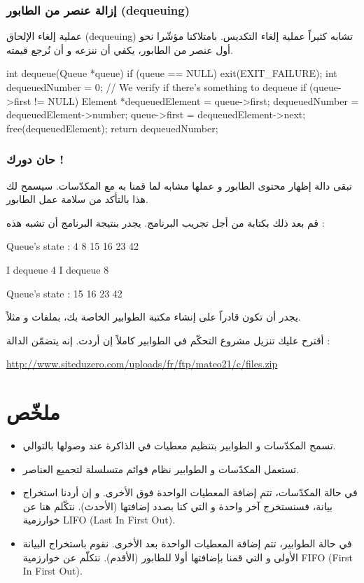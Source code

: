\subsubsection{إزالة عنصر من الطابور (\textenglish{dequeuing})}

عملية إلغاء الإلحاق 
(\textenglish{dequeuing})
تشابه كثيراً عملية إلغاء التكديس. بامتلاكنا مؤشّرا نحو أول عنصر من الطابور، يكفي أن ننزعه و أن نُرجع قيمته.

\begin{Csource}
int dequeue(Queue *queue)
{
	if (queue == NULL)
	{
		exit(EXIT_FAILURE);
	}
	int dequeuedNumber = 0;
	// We verify if there's something to dequeue
	if (queue->first != NULL)
	{
		Element *dequeuedElement = queue->first;
		dequeuedNumber = dequeuedElement->number;
		queue->first = dequeuedElement->next;
		free(dequeuedElement);
	}
	return dequeuedNumber;
}
\end{Csource}

\subsubsection{حان دورك !}

تبقى دالة إظهار محتوى الطابور
و عملها مشابه لما قمنا به مع المكدّسات. سيسمح لك هذا بالتأكد من سلامة عمل الطابور.

قم بعد ذلك بكتابة
من أجل تجريب البرنامج. يجدر بنتيجة البرنامج أن تشبه هذه :

\begin{Console}
Queue's state :
4 8 15 16 23 42

I dequeue 4
I dequeue 8

Queue's state :
15 16 23 42
\end{Console}

يجدر أن تكون قادراً على إنشاء مكتبة الطوابير الخاصة بك، بملفات
و
مثلاً.

أقترح عليك تنزيل مشروع التحكّم في الطوابير كاملاً إن أردت. إنه يتضمّن الدالة
 :

\url{http://www.siteduzero.com/uploads/fr/ftp/mateo21/c/files.zip}

\section*{ملخّص}

\begin{itemize}
	\item تسمح المكدّسات و الطوابير بتنظيم معطيات في الذاكرة عند وصولها بالتوالي.
	\item تستعمل المكدّسات و الطوابير نظام قوائم متسلسلة لتجميع العناصر.
	\item في حالة المكدّسات، تتم إضافة المعطيات الواحدة فوق الأخرى. و إن أردنا استخراج بيانة، فسنستخرج آخر واحدة و التي كنا بصدد إضافتها (الأحدث). نتكّلم هنا عن خوارزمية 
	\textenglish{LIFO} (\textenglish{Last In First Out}).
	\item في حالة الطوابير، تتم إضافة المعطيات الواحدة بعد الأخرى. نقوم باستخراج البيانة الأولى و التي قمنا بإضافتها أولا للطابور (الأقدم). نتكلّم عن خوارزمية
	\textenglish{FIFO} (\textenglish{First In First Out}).
\end{itemize}

